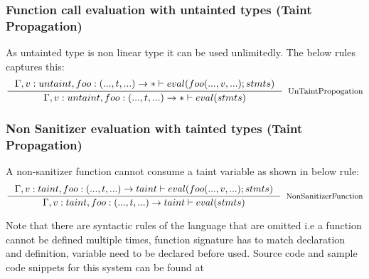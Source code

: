 \documentclass[11pt, pdftex]{article}
\begin{document}
\subsubsection{Function call evaluation with untainted types (Taint Propagation) }
As untainted type is non linear type it can be used unlimitedly. The below rules captures this:
$$ \inference {\Gamma , v:untaint , foo:(...,t,...) \to * \vdash eval(foo(...,v,...);stmts)}{\Gamma ,  v:untaint , foo:(...,t,...) \to * \vdash eval(stmts)}[UnTaintPropogation]$$
\subsubsection{Non Sanitizer evaluation with tainted types (Taint Propagation)}
A non-sanitizer function cannot consume a taint variable as shown in below rule:
$$ \inference {\Gamma , v:taint , foo:(...,t,...) \to taint \vdash eval(foo(...,v,...);stmts)}{\Gamma ,  v:taint , foo:(...,t,...) \to taint \vdash eval(stmts)}[NonSanitizerFunction]$$

Note that there are syntactic rules of the language that are omitted i.e a function cannot be defined multiple times, function signature has to match declaration and definition, variable need to be declared before used. Source code and sample code snippets for this system can be found at \cite{laintgit}


\end{document}
